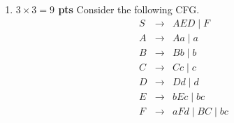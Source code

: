 \documentclass[10pt]{article}
\newcommand {\pts}[1]{{\bf #1 pts}}
\begin{document}
\begin{enumerate}
\begin{enumerate}
\[\begin{array}{cll}
            R &\Rightarrow R^* &(R\rightarrow R ^{*})\\
            &\Rightarrow (R)^* &(R\rightarrow (R))\\
            &\Rightarrow (R+R)^*&(R\rightarrow R+R)\\
            &\Rightarrow (R+RR)^*&(R\rightarrow RR)\\
            &\Rightarrow (R+Rb)^* &(R\rightarrow b)\\
            &\Rightarrow (R+R^*b)^*&(R\rightarrow b)\\
            &\Rightarrow (R+(R)^*b)^* &(R\rightarrow (R))\\
            &\Rightarrow (R+(RR)^*b)^*&(R\rightarrow RR)\\
            &\Rightarrow (R+(Ra)^*b)^*&(R\rightarrow a)\\
            &\Rightarrow (R+(ba)^*b)^*&(R\rightarrow b)\\
            &\Rightarrow (a+(ba)^*b)^*&(R\rightarrow b)
          \end{array}
            \]
  \item For the derivation in above solution, provide the corresponding parse tree.
            \[
              \begin{tikzpicture}
              \node  {R}
                child{node  {R}
                  child{node  {(}}
                  child{node  {R}
                    child{node  {R}
                      child{node  {a}}
                    }
                    child{node  {+}}
                    child{node  {R}
                      child{node  {R}
                        child{node  {R}
                          child{node  {(}}
                          child{node  {R}
                            child{node  {R}
                              child{node  {b}
                            }}
                            child{node  {R}
                              child{node  {a}
                            }}}
                          child{node {)}}}
                        child{node  {$^{*}$}}}
                      child{node  {R}
                        child{node  {b}}}}}
                  child{node {)}}}
                child{node  {$^{*}$}};
              \end{tikzpicture}
            \]
\end{enumerate}



   \newpage

\item \pts{$3\times 3= 9$} Consider the following CFG.
\[\begin{array}{cll}
S & \rightarrow & AED \mid F \\
A & \rightarrow & Aa \mid a \\
B & \rightarrow & Bb \mid b \\
C & \rightarrow & Cc \mid c \\
D & \rightarrow & Dd \mid d \\
E & \rightarrow & bEc \mid bc \\
F & \rightarrow & aFd \mid BC \mid bc
\end{array}\]


\end{enumerate}
\end{document}
